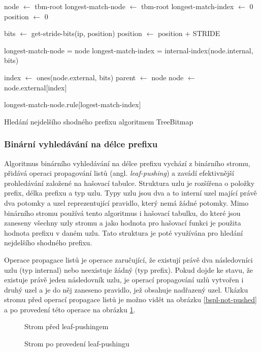 \begin{algorithm}[H]
	node $\leftarrow$ tbm-root\;
	longest-match-node $\leftarrow$ tbm-root\;
	longest-match-index $\leftarrow$ 0\;
	position $\leftarrow$ 0\;
	{
		bits $\leftarrow$ get-stride-bits(ip, position)\;
		position $\leftarrow$ position + STRIDE\;


		{
			longest-match-node = node\;
			longest-match-index = internal-index(node.internal, bits)\;
		}

		index $\leftarrow$ ones(node.external, bits)\;
		parent $\leftarrow$ node\;
		node $\leftarrow$ node.external[index]\;
	}
	\Return longest-match-node.rule[logest-match-index]\;
	\caption{Hledání nejdelšího shodného prefixu algoritmem TreeBitmap}
    \label{alg:treebitmap}
\end{algorithm}

\subsubsection{Binární vyhledávání na délce prefixu} %

Algoritmus binárního vyhledávání na délce prefixu vychází z binárního stromu, přidává
operaci propagování listů (angl. \textit{leaf-pushing}) a zavádí efektivnější prohledávání založené na hašovací
tabulce.
Struktura uzlu je rozšířena o položky prefix, délka prefixu a typ uzlu.
Typy uzlu jsou dva a to interní uzel mající právě dva potomky a uzel reprezentující pravidlo, který nemá žádné potomky.
Mimo binárního stromu používá tento algoritmus i hašovací tabulku, do které jsou zaneseny všechny uzly
stromu a jako hodnota pro hašovací funkci je použita hodnota prefixu v daném uzlu. Tato struktura
je poté využívána pro hledání nejdelšího shodného prefixu.


Operace propagace listů je operace zaručující, že existují právě dva následovníci uzlu (typ internal) nebo neexistuje žádný (typ prefix).
Pokud dojde ke stavu, že existuje právě jeden následovník uzlu, je operací propagování uzlů
vytvořen i druhý uzel a je do něj zaneseno pravidlo, jež obsahuje nadřazený uzel.
Ukázku stromu před operací propagace listů je možno vidět na obrázku \ref{bspl-not-pushed}
a po provedení této operace na obrázku \ref{bspl-pushed}.

\begin{figure}[!htbp]
    \begin{floatrow}
            {\caption{Strom před leaf-pushingem}\label{bspl-not-pushed}}
            {\caption{Strom po provedení leaf-pushingu}\label{bspl-pushed}}
    \end{floatrow}
\end{figure}


